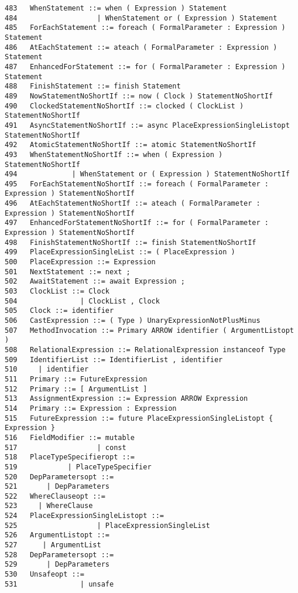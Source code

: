 {\begin{verbatim}
483   WhenStatement ::= when ( Expression ) Statement
484                   | WhenStatement or ( Expression ) Statement
485   ForEachStatement ::= foreach ( FormalParameter : Expression ) Statement
486   AtEachStatement ::= ateach ( FormalParameter : Expression ) Statement
487   EnhancedForStatement ::= for ( FormalParameter : Expression ) Statement
488   FinishStatement ::= finish Statement
489   NowStatementNoShortIf ::= now ( Clock ) StatementNoShortIf
490   ClockedStatementNoShortIf ::= clocked ( ClockList ) StatementNoShortIf
491   AsyncStatementNoShortIf ::= async PlaceExpressionSingleListopt StatementNoShortIf
492   AtomicStatementNoShortIf ::= atomic StatementNoShortIf
493   WhenStatementNoShortIf ::= when ( Expression ) StatementNoShortIf
494             | WhenStatement or ( Expression ) StatementNoShortIf
495   ForEachStatementNoShortIf ::= foreach ( FormalParameter : Expression ) StatementNoShortIf
496   AtEachStatementNoShortIf ::= ateach ( FormalParameter : Expression ) StatementNoShortIf
497   EnhancedForStatementNoShortIf ::= for ( FormalParameter : Expression ) StatementNoShortIf
498   FinishStatementNoShortIf ::= finish StatementNoShortIf
499   PlaceExpressionSingleList ::= ( PlaceExpression )
500   PlaceExpression ::= Expression
501   NextStatement ::= next ;
502   AwaitStatement ::= await Expression ;
503   ClockList ::= Clock
504               | ClockList , Clock
505   Clock ::= identifier
506   CastExpression ::= ( Type ) UnaryExpressionNotPlusMinus
507   MethodInvocation ::= Primary ARROW identifier ( ArgumentListopt )
508   RelationalExpression ::= RelationalExpression instanceof Type
509   IdentifierList ::= IdentifierList , identifier
510     | identifier
511   Primary ::= FutureExpression
512   Primary ::= [ ArgumentList ]
513   AssignmentExpression ::= Expression ARROW Expression
514   Primary ::= Expression : Expression
515   FutureExpression ::= future PlaceExpressionSingleListopt { Expression }
516   FieldModifier ::= mutable
517                   | const
518   PlaceTypeSpecifieropt ::=
519            | PlaceTypeSpecifier
520   DepParametersopt ::=
521       | DepParameters
522   WhereClauseopt ::=
523     | WhereClause
524   PlaceExpressionSingleListopt ::=
525                   | PlaceExpressionSingleList
526   ArgumentListopt ::=
527      | ArgumentList
528   DepParametersopt ::=
529       | DepParameters
530   Unsafeopt ::=
531               | unsafe
\end{verbatim}
}

\twocolumn